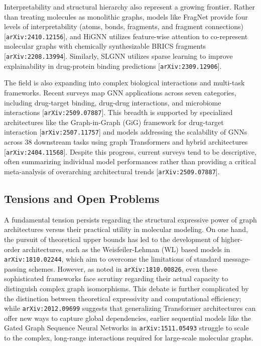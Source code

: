 \documentclass[11pt]{article}
\begin{document}
Interpretability and structural hierarchy also represent a growing frontier. Rather than treating molecules as monolithic graphs, models like FragNet provide four levels of interpretability (atoms, bonds, fragments, and fragment connections) [\texttt{arXiv:2410.12156}], and HiGNN utilizes feature-wise attention to co-represent molecular graphs with chemically synthesizable BRICS fragments [\texttt{arXiv:2208.13994}]. Similarly, SLGNN utilizes sparse learning to improve explainability in drug-protein binding predictions [\texttt{arXiv:2309.12906}].

The field is also expanding into complex biological interactions and multi-task frameworks. Recent surveys map GNN applications across seven categories, including drug-target binding, drug-drug interactions, and microbiome interactions [\texttt{arXiv:2509.07887}]. This breadth is supported by specialized architectures like the Graph-in-Graph (GiG) framework for drug-target interaction [\texttt{arXiv:2507.11757}] and models addressing the scalability of GNNs across 38 downstream tasks using graph Transformers and hybrid architectures [\texttt{arXiv:2404.11568}]. Despite this progress, current surveys tend to be descriptive, often summarizing individual model performances rather than providing a critical meta-analysis of overarching architectural trends [\texttt{arXiv:2509.07887}].

\subsection{Tensions and Open Problems}

A fundamental tension persists regarding the structural expressive power of graph architectures versus their practical utility in molecular modeling. On one hand, the pursuit of theoretical upper bounds has led to the development of higher-order architectures, such as the Weisfeiler-Lehman (WL) based models in \texttt{arXiv:1810.02244}, which aim to overcome the limitations of standard message-passing schemes. However, as noted in \texttt{arXiv:1810.00826}, even these sophisticated frameworks face scrutiny regarding their actual capacity to distinguish complex graph isomorphisms. This debate is further complicated by the distinction between theoretical expressivity and computational efficiency; while \texttt{arXiv:2012.09699} suggests that generalizing Transformer architectures can offer new ways to capture global dependencies, earlier sequential models like the Gated Graph Sequence Neural Networks in \texttt{arXiv:1511.05493} struggle to scale to the complex, long-range interactions required for large-scale molecular graphs.
\end{document}
